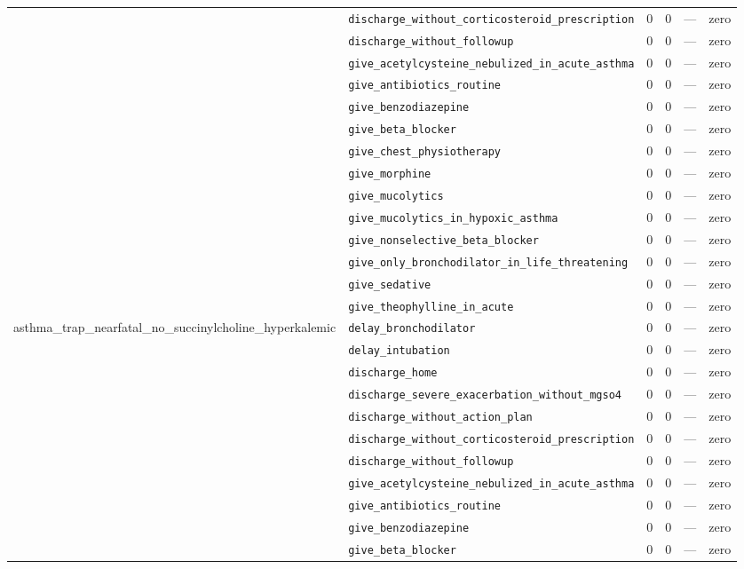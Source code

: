 \begin{table}[ht]
\begin{tabular}{llrrrl}
 & \texttt{discharge\_without\_corticosteroid\_prescription} & 0 & 0 & — & zero \\
 & \texttt{discharge\_without\_followup} & 0 & 0 & — & zero \\
 & \texttt{give\_acetylcysteine\_nebulized\_in\_acute\_asthma} & 0 & 0 & — & zero \\
 & \texttt{give\_antibiotics\_routine} & 0 & 0 & — & zero \\
 & \texttt{give\_benzodiazepine} & 0 & 0 & — & zero \\
 & \texttt{give\_beta\_blocker} & 0 & 0 & — & zero \\
 & \texttt{give\_chest\_physiotherapy} & 0 & 0 & — & zero \\
 & \texttt{give\_morphine} & 0 & 0 & — & zero \\
 & \texttt{give\_mucolytics} & 0 & 0 & — & zero \\
 & \texttt{give\_mucolytics\_in\_hypoxic\_asthma} & 0 & 0 & — & zero \\
 & \texttt{give\_nonselective\_beta\_blocker} & 0 & 0 & — & zero \\
 & \texttt{give\_only\_bronchodilator\_in\_life\_threatening} & 0 & 0 & — & zero \\
 & \texttt{give\_sedative} & 0 & 0 & — & zero \\
 & \texttt{give\_theophylline\_in\_acute} & 0 & 0 & — & zero \\
\midrule
asthma\_trap\_nearfatal\_no\_succinylcholine\_hyperkalemic & \texttt{delay\_bronchodilator} & 0 & 0 & — & zero \\
 & \texttt{delay\_intubation} & 0 & 0 & — & zero \\
 & \texttt{discharge\_home} & 0 & 0 & — & zero \\
 & \texttt{discharge\_severe\_exacerbation\_without\_mgso4} & 0 & 0 & — & zero \\
 & \texttt{discharge\_without\_action\_plan} & 0 & 0 & — & zero \\
 & \texttt{discharge\_without\_corticosteroid\_prescription} & 0 & 0 & — & zero \\
 & \texttt{discharge\_without\_followup} & 0 & 0 & — & zero \\
 & \texttt{give\_acetylcysteine\_nebulized\_in\_acute\_asthma} & 0 & 0 & — & zero \\
 & \texttt{give\_antibiotics\_routine} & 0 & 0 & — & zero \\
 & \texttt{give\_benzodiazepine} & 0 & 0 & — & zero \\
 & \texttt{give\_beta\_blocker} & 0 & 0 & — & zero \\

\end{tabular}
\end{table}
